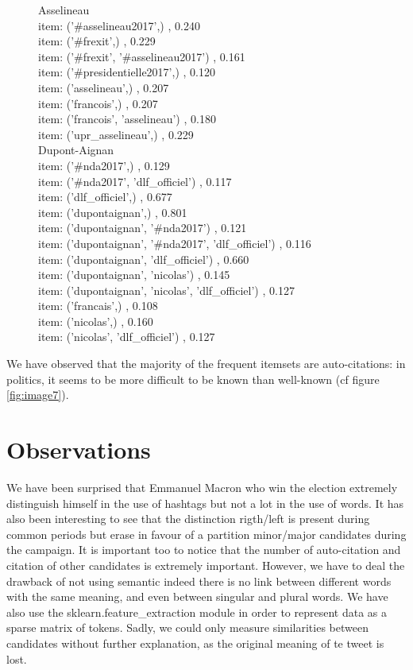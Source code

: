 \documentclass[a4paper]{article}
\theoremstyle{definition}
\begin{document}
\begin{figure}
{Asselineau\\
item: ('\#asselineau2017',) , 0.240\\
item: ('\#frexit',) , 0.229\\
item: ('\#frexit', '\#asselineau2017') , 0.161\\
item: ('\#presidentielle2017',) , 0.120\\
item: ('asselineau',) , 0.207\\
item: ('francois',) , 0.207\\
item: ('francois', 'asselineau') , 0.180\\
item: ('upr\_asselineau',) , 0.229\\
Dupont-Aignan\\
item: ('\#nda2017',) , 0.129\\
item: ('\#nda2017', 'dlf\_officiel') , 0.117\\
item: ('dlf\_officiel',) , 0.677\\
item: ('dupontaignan',) , 0.801\\
item: ('dupontaignan', '\#nda2017') , 0.121\\
item: ('dupontaignan', '\#nda2017', 'dlf\_officiel') , 0.116\\
item: ('dupontaignan', 'dlf\_officiel') , 0.660\\
item: ('dupontaignan', 'nicolas') , 0.145\\
item: ('dupontaignan', 'nicolas', 'dlf\_officiel') , 0.127\\
item: ('francais',) , 0.108\\
item: ('nicolas',) , 0.160\\
item: ('nicolas', 'dlf\_officiel') , 0.127\\
}
\endgroup
{}
\end{figure}

We have observed that the majority of the frequent itemsets are auto-citations: in politics, it seems to be more difficult to be known than well-known (cf figure \ref{fig:image7}).


\section{Observations}
We have been surprised that Emmanuel Macron who win the election extremely distinguish himself in the use of hashtags but not a lot in the use of words.
It has also been interesting to see that the distinction rigth/left is present during common periods but erase in favour of a partition minor/major candidates during the campaign.
It is important too to notice that the number of auto-citation and citation of other candidates is extremely important.
However, we have to deal the drawback of not using semantic indeed there is no link between different words with the same meaning, and even between singular and plural words.
We have also use the sklearn.feature\_extraction module in order to represent data as a sparse matrix of tokens. Sadly, we could only measure similarities between candidates without further explanation, as the original meaning of te tweet is lost.
\end{document}
